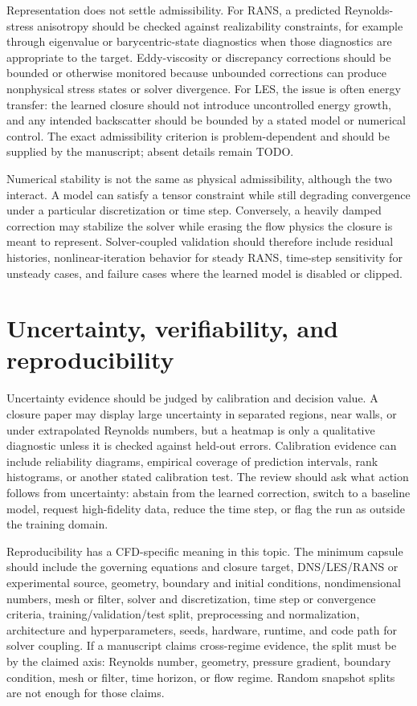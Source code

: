 \documentclass[11pt]{article}
\begin{document}
Representation does not settle admissibility. For RANS, a predicted Reynolds-stress anisotropy should be checked against realizability constraints, for example through eigenvalue or barycentric-state diagnostics when those diagnostics are appropriate to the target. Eddy-viscosity or discrepancy corrections should be bounded or otherwise monitored because unbounded corrections can produce nonphysical stress states or solver divergence. For LES, the issue is often energy transfer: the learned closure should not introduce uncontrolled energy growth, and any intended backscatter should be bounded by a stated model or numerical control. The exact admissibility criterion is problem-dependent and should be supplied by the manuscript; absent details remain TODO.

Numerical stability is not the same as physical admissibility, although the two interact. A model can satisfy a tensor constraint while still degrading convergence under a particular discretization or time step. Conversely, a heavily damped correction may stabilize the solver while erasing the flow physics the closure is meant to represent. Solver-coupled validation should therefore include residual histories, nonlinear-iteration behavior for steady RANS, time-step sensitivity for unsteady cases, and failure cases where the learned model is disabled or clipped.

\section{Uncertainty, verifiability, and reproducibility}

Uncertainty evidence should be judged by calibration and decision value. A closure paper may display large uncertainty in separated regions, near walls, or under extrapolated Reynolds numbers, but a heatmap is only a qualitative diagnostic unless it is checked against held-out errors. Calibration evidence can include reliability diagrams, empirical coverage of prediction intervals, rank histograms, or another stated calibration test. The review should ask what action follows from uncertainty: abstain from the learned correction, switch to a baseline model, request high-fidelity data, reduce the time step, or flag the run as outside the training domain.

Reproducibility has a CFD-specific meaning in this topic. The minimum capsule should include the governing equations and closure target, DNS/LES/RANS or experimental source, geometry, boundary and initial conditions, nondimensional numbers, mesh or filter, solver and discretization, time step or convergence criteria, training/validation/test split, preprocessing and normalization, architecture and hyperparameters, seeds, hardware, runtime, and code path for solver coupling. If a manuscript claims cross-regime evidence, the split must be by the claimed axis: Reynolds number, geometry, pressure gradient, boundary condition, mesh or filter, time horizon, or flow regime. Random snapshot splits are not enough for those claims.
\end{document}

